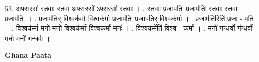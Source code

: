 \documentclass[17pt]{extarticle}
\begin{document}
53. अ॒फ्स॒रसः॑ स्त॒वाः स्त॒वा अ॑फ्स॒रसो᳚ ऽफ्स॒रसः॑ स्त॒वाः । . स्त॒वाः प्र॒जाप॑तिः प्र॒जाप॑तिः स्त॒वाः स्त॒वाः प्र॒जाप॑तिः । . प्र॒जाप॑तिर् वि॒श्वक॑र्मा वि॒श्वक॑र्मा प्र॒जाप॑तिः प्र॒जाप॑तिर् वि॒श्वक॑र्मा । . प्र॒जाप॑ति॒रिति॑ प्र॒जा - प॒तिः॒ । . वि॒श्वक॑र्मा॒ मनो॒ मनो॑ वि॒श्वक॑र्मा वि॒श्वक॑र्मा॒ मनः॑ । . वि॒श्वक॒र्मेति॑ वि॒श्व - क॒र्मा॒ । . मनो॑ गन्ध॒र्वो ग॑न्ध॒र्वो मनो॒ मनो॑ गन्ध॒र्वः । \newline

\textbf{Ghana Paata } \newline
\end{document}
